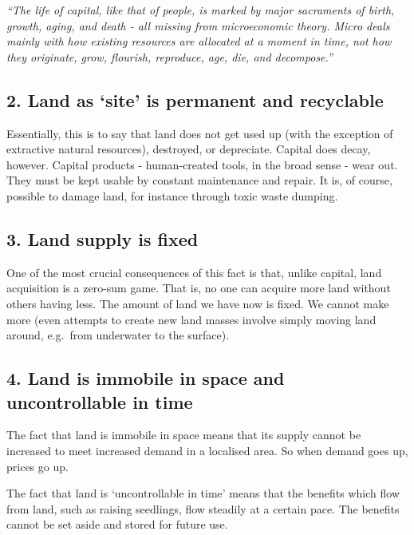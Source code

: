 \documentclass[]{tufte-handout}
\begin{document}
\emph{``The life of capital, like that of people, is marked by major
sacraments of birth, growth, aging, and death - all missing from
microeconomic theory. Micro deals mainly with how existing resources are
allocated at a moment in time, not how they originate, grow, flourish,
reproduce, age, die, and decompose.''}

\hypertarget{land-as-site-is-permanent-and-recyclable}{%
\subsection{2. Land as `site' is permanent and
recyclable}\label{land-as-site-is-permanent-and-recyclable}}

Essentially, this is to say that land does not get used up (with the
exception of extractive natural resources), destroyed, or depreciate.
Capital does decay, however. Capital products - human-created tools, in
the broad sense - wear out. They must be kept usable by constant
maintenance and repair. It is, of course, possible to damage land, for
instance through toxic waste dumping.

\hypertarget{land-supply-is-fixed}{%
\subsection{3. Land supply is fixed}\label{land-supply-is-fixed}}

One of the most crucial consequences of this fact is that, unlike
capital, land acquisition is a zero-sum game. That is, no one can
acquire more land without others having less. The amount of land we have
now is fixed. We cannot make more (even attempts to create new land
masses involve simply moving land around, e.g.~from underwater to the
surface).

\hypertarget{land-is-immobile-in-space-and-uncontrollable-in-time}{%
\subsection{4. Land is immobile in space and uncontrollable in
time}\label{land-is-immobile-in-space-and-uncontrollable-in-time}}

The fact that land is immobile in space means that its supply cannot be
increased to meet increased demand in a localised area. So when demand
goes up, prices go up.

The fact that land is `uncontrollable in time' means that the benefits
which flow from land, such as raising seedlings, flow steadily at a
certain pace. The benefits cannot be set aside and stored for future
use.
\end{document}
